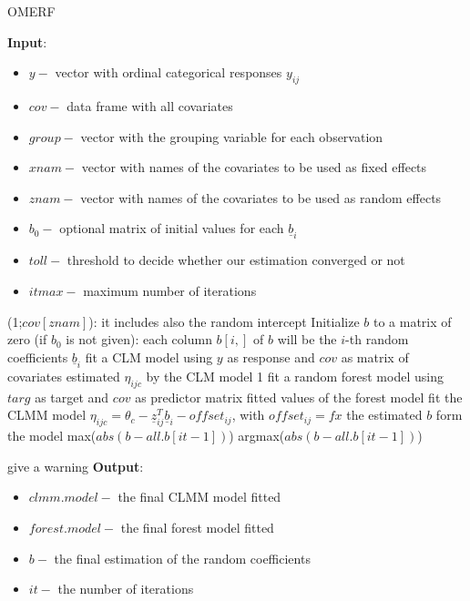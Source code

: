\begin{algorithm}[H]
\caption{OMERF}
\label{alg:alg_omerf}
\large
\begin{algorithmic}[1]
\STATE \textbf{Input}:
    \begin{itemize}[label={}, leftmargin=*]
        \item {$y-$} vector with ordinal categorical responses {$y_{ij}$}
        \item {$cov-$} data frame with all covariates
        \item {$group-$} vector with the grouping variable for each observation
        \item {$xnam-$} vector with names of the covariates to be used as fixed effects
        \item {$znam-$} vector with names of the covariates to be used as random effects
        \item {$b_{0}-$} optional matrix of initial values for each {$\underline{b}_{i}$}
        \item {$toll-$} threshold to decide whether our estimation converged or not
        \item {$itmax-$} maximum number of iterations
    \end{itemize}
 (1;{$cov[znam]$}): it includes also the random intercept
\STATE Initialize {$b$} to a matrix of zero (if {$b_{0}$} is not given): each column {$b[i,]$} of {$b$} will be the {$i$}-th random coefficients {$\underline{b}_{i}$}
\STATE fit a CLM model using {$y$} as response and {$cov$} as matrix of covariates
 estimated {$\eta_{ijc}$} by the CLM model
 1
    \STATE fit a random forest model using {$targ$} as target and {$cov$} as predictor matrix
     fitted values of the forest model
    \STATE fit the CLMM model {$\eta_{ijc} = \theta_{c} - \underline{z}_{ij}^T \underline{b}_{i} - offset_{ij}$}, with {$offset_{ij} =  fx$}
     the estimated {$b$} form the model
     max({$abs(b-all.b[it-1])$})
     argmax({$abs(b-all.b[it-1])$})
         \TRUE
    \ELSE
         \FALSE
    \ENDIF
\ENDWHILE

    \STATE give a warning
\ENDIF
\STATE \textbf{Output}:
    \begin{itemize}[label={}, leftmargin=*]
        \item {$clmm.model-$} the final CLMM model fitted
        \item {$forest.model-$} the final forest model fitted
        \item {$b-$} the final estimation of the random coefficients
        \item {$it-$} the number of iterations
    \end{itemize}

\end{algorithmic}
\end{algorithm} 
